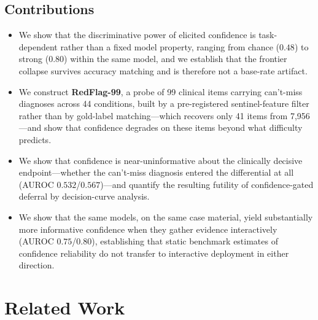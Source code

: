 \documentclass[journal,twoside]{IEEEtran}
\begin{document}
\subsection{Contributions}
\begin{itemize}
\item We show that the discriminative power of elicited confidence is task-dependent rather than a
fixed model property, ranging from chance ($0.48$) to strong ($0.80$) within the same model, and we
establish that the frontier collapse survives accuracy matching and is therefore not a base-rate
artifact.
\item We construct \textbf{RedFlag-99}, a probe of 99 clinical items carrying can't-miss diagnoses
across 44 conditions, built by a pre-registered sentinel-feature filter rather than by gold-label
matching---which recovers only 41 items from 7{,}956---and show that confidence degrades on these
items beyond what difficulty predicts.
\item We show that confidence is near-uninformative about the clinically decisive endpoint---whether
the can't-miss diagnosis entered the differential at all (AUROC $0.532$/$0.567$)---and quantify the
resulting futility of confidence-gated deferral by decision-curve analysis.
\item We show that the same models, on the same case material, yield substantially more informative
confidence when they gather evidence interactively (AUROC $0.75$/$0.80$), establishing that static
benchmark estimates of confidence reliability do not transfer to interactive deployment in either
direction.
\end{itemize}

\section{Related Work}
\end{document}
